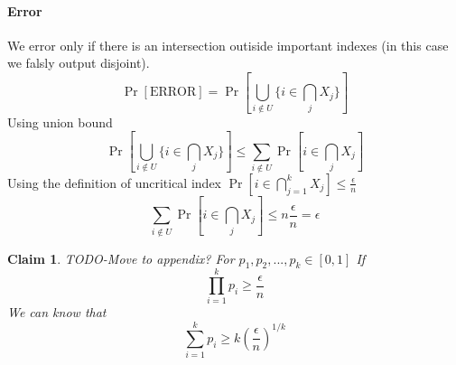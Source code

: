 \documentclass{article}
\theoremstyle{plain}
\newtheorem{claim}{Claim}
\begin{document}
\paragraph{Error}
We error only if there is an intersection outiside important indexes (in this case we falsly output disjoint).
\begin{equation*}
    \Pr[\text{ERROR}] = \Pr[\bigcup_{i \notin U} \{i \in \bigcap_j X_j\}]
\end{equation*}
Using union bound
\begin{equation*}
    \Pr[\bigcup_{i \notin U} \{i \in \bigcap_j X_j\}]\leq \sum_{i \notin U} \Pr[i \in \bigcap_j X_j] 
\end{equation*}
Using the definition of uncritical index $\Pr[i \in \bigcap^{k}_{j=1}{X_j}] \leq \frac{\epsilon}{n}$
\begin{equation*}
    \sum_{i \notin U} \Pr[i \in \bigcap_j X_j] \leq n\frac{\epsilon}{n} = \epsilon
\end{equation*}
\begin{claim}
TODO-Move to appendix? \newline
For $p_1, p_2, ... , p_k \in [0,1]$ \newline
If
\begin{equation*}
    \prod_{i=1}^{k}p_i \geq \frac{\epsilon}{n}
\end{equation*}
We can know that
\begin{equation*}
    \sum_{i=1}^{k}p_i \geq k\left(\frac{\epsilon}{n}\right)^{1/k}
\end{equation*}
\end{claim}
\end{document}
